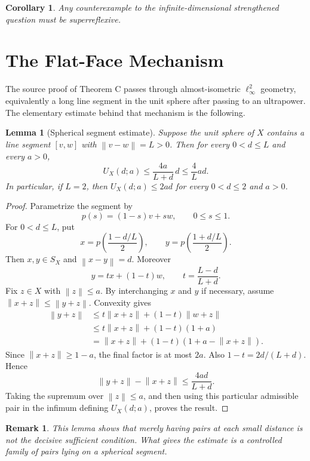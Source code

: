 \documentclass[11pt]{article}
\newtheorem{lemma}{Lemma}
\newtheorem{corollary}{Corollary}
\newtheorem{remark}{Remark}
\newcommand{\norm}[1]{\left\lVert #1 \right\rVert}
\begin{document}
\begin{corollary}
Any counterexample to the infinite-dimensional strengthened question
must be superreflexive.
\end{corollary}

\section*{The Flat-Face Mechanism}

The source proof of Theorem C passes through almost-isometric
\(\ell_\infty^2\) geometry, equivalently a long line segment in the
unit sphere after passing to an ultrapower.  The elementary estimate
behind that mechanism is the following.

\begin{lemma}[Spherical segment estimate]
Suppose the unit sphere of \(X\) contains a line segment \([v,w]\) with
\(\norm{v-w}=L>0\).  Then for every \(0<d\le L\) and every \(a>0\),
\[
  U_X(d;a)\le \frac{4a}{L+d}\,d
  \le \frac{4}{L}ad.
\]
In particular, if \(L=2\), then \(U_X(d;a)\le 2ad\) for every
\(0<d\le 2\) and \(a>0\).
\end{lemma}

\begin{proof}
Parametrize the segment by
\[
  p(s)=(1-s)v+sw,\qquad 0\le s\le 1.
\]
For \(0<d\le L\), put
\[
  x=p\!\left(\frac{1-d/L}{2}\right),
  \qquad
  y=p\!\left(\frac{1+d/L}{2}\right).
\]
Then \(x,y\in S_X\) and \(\norm{x-y}=d\).  Moreover
\[
  y=tx+(1-t)w,
  \qquad
  t=\frac{L-d}{L+d}.
\]
Fix \(z\in X\) with \(\norm{z}\le a\).  By interchanging \(x\) and \(y\)
if necessary, assume \(\norm{x+z}\le \norm{y+z}\).  Convexity gives
\[
\begin{aligned}
  \norm{y+z}
  &\le t\norm{x+z}+(1-t)\norm{w+z} \\
  &\le t\norm{x+z}+(1-t)(1+a)       \\
  &=\norm{x+z}+(1-t)(1+a-\norm{x+z}).
\end{aligned}
\]
Since \(\norm{x+z}\ge 1-a\), the final factor is at most \(2a\).
Also \(1-t=2d/(L+d)\).  Hence
\[
  \norm{y+z}-\norm{x+z}
  \le
  \frac{4ad}{L+d}.
\]
Taking the supremum over \(\norm{z}\le a\), and then using this
particular admissible pair in the infimum defining \(U_X(d;a)\), proves
the result.
\end{proof}

\begin{remark}
This lemma shows that merely having pairs at each small distance is not
the decisive sufficient condition.  What gives the estimate is a
controlled family of pairs lying on a spherical segment.
\end{remark}
\end{document}
